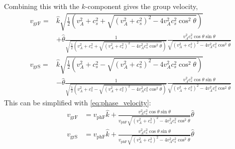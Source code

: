 \documentclass[a4paper]{article}
\begin{document}
Combining this with the $k$-component gives the group velocity,
\begin{align*}
    v_\text{grF} = &\hat{k}\sqrt{\frac{1}{2}\left(v_A^2 + c_s^2 + \sqrt{(v_A^2 + c_s^2)^2 - 4v_A^2c_s^2\cos^2\theta}\right)}\\ &+ \hat{\theta}\frac{1}{\sqrt{\frac{1}{2}\left(v_A^2 + c_s^2 + \sqrt{(v_A^2 + c_s^2)^2 - 4v_A^2c_s^2\cos^2\theta}\right)}}\frac{v_A^2c_s^2\cos\theta\sin\theta}{\sqrt{(v_A^2 + c_s^2)^2 - 4v_A^2c_s^2\cos^2\theta}}\\
    v_\text{grS} = &\hat{k}\sqrt{\frac{1}{2}\left(v_A^2 + c_s^2 - \sqrt{(v_A^2 + c_s^2)^2 - 4v_A^2c_s^2\cos^2\theta}\right)}\\ &- \hat{\theta}\frac{1}{\sqrt{\frac{1}{2}\left(v_A^2 + c_s^2 - \sqrt{(v_A^2 + c_s^2)^2 - 4v_A^2c_s^2\cos^2\theta}\right)}}\frac{v_A^2c_s^2\cos\theta\sin\theta}{\sqrt{(v_A^2 + c_s^2)^2 - 4v_A^2c_s^2\cos^2\theta}}
\end{align*}
This can be simplified with \cref{eq:phase_velocity}:
\begin{align*}
	v_{\text{grF}} &= v_\text{phF}  \hat{k} + \frac{v_A^2c_s^2 \cos \theta \sin \theta}{v_\text{phF} \sqrt{(v_A^2 + c_s^2)^2 - 4v_A^2c_s^2 \cos^2 \theta}} \hat{\theta}\\
	v_{\text{grS}} &= v_\text{phF}  \hat{k} + \frac{v_A^2c_s^2 \cos \theta \sin \theta}{v_\text{phF} \sqrt{(v_A^2 + c_s^2)^2 - 4v_A^2c_s^2 \cos^2 \theta}} \hat{\theta}\\
\end{align*}
\end{document}
